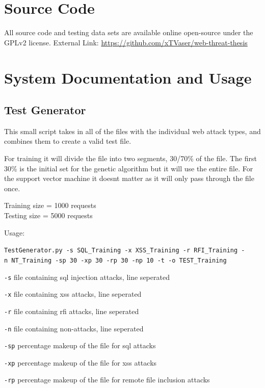 \begin{appendices}

\chapter{Source Code}

All source code and testing data sets are available online open-source under the GPLv2 license. External Link: \href{https://github.com/xTVaser/web-threat-thesis}{https://github.com/xTVaser/web-threat-thesis}

\chapter{System Documentation and Usage}
\section{Test Generator} \label{app:testGeneratorDocumentation}

This small script takes in all of the files with the individual web
attack types, and combines them to create a valid test file.

For training it will divide the file into two segments, 30/70\% of the
file. The first 30\% is the initial set for the genetic algorithm but it
will use the entire file. For the support vector machine it doesnt
matter as it will only pass through the file once.

Training size = 1000 requests\\
Testing size = 5000 requests

Usage:

\texttt{TestGenerator.py\ -s\ SQL\_Training\ -x\ XSS\_Training\ -r\ RFI\_Training\ -n\ NT\_Training\ -sp\ 30\ -xp\ 30\ -rp\ 30\ -np\ 10\ -t\ -o\ TEST\_Training}

\texttt{-s} file containing sql injection attacks, line seperated

\texttt{-x} file containing xss attacks, line seperated

\texttt{-r} file containing rfi attacks, line seperated

\texttt{-n} file containing non-attacks, line seperated

\texttt{-sp} percentage makeup of the file for sql attacks

\texttt{-xp} percentage makeup of the file for xss attacks

\texttt{-rp} percentage makeup of the file for remote file inclusion
attacks


\end{appendices}
